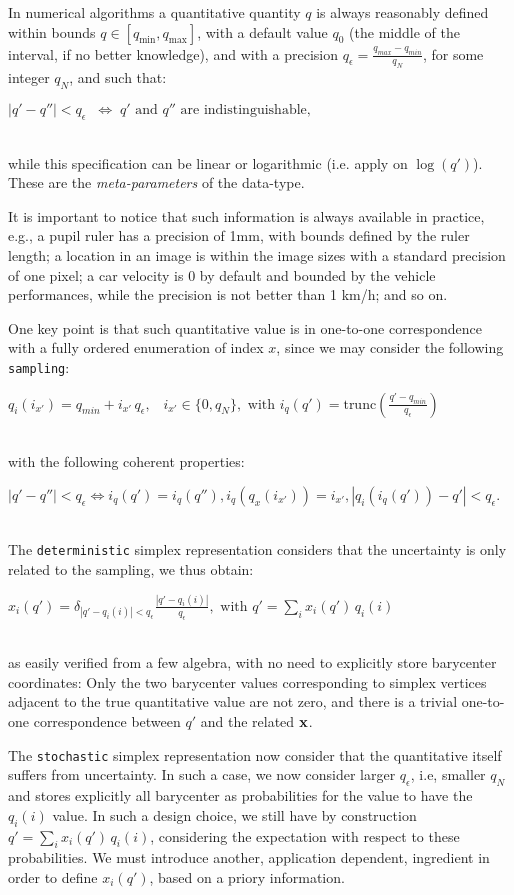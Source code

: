 \documentclass[a4,12pt]{article}
\newcommand{\eqline}[1]{\\\centerline{$#1$}\\}
\begin{document}
In numerical algorithms a quantitative quantity $q$ is always reasonably defined within bounds $q \in [q_{\min}, q_{\max}]$, with a default value $q_0$ (the middle of the interval, if no better knowledge), and with a precision $q_\epsilon = \frac{q_{max} - q_{min}}{q_N}$, for some integer $q_N$, and such that:
\eqline{|q' - q''| < q_\epsilon \;\;\Leftrightarrow\; \mbox{$q'$ and $q''$ are indistinguishable},}
while this specification can be linear or logarithmic (i.e. apply on $\log(q')$). These are the {\em meta-parameters} of the data-type.

It is important to notice that such information is always available in practice, e.g., a pupil ruler has a precision of 1mm, with bounds defined by the ruler length; a location in an image is within the image sizes with a standard precision of one pixel; a car velocity is 0 by default and bounded by the vehicle performances, while the precision is not better than 1 km/h; and so on.

One key point is that such quantitative value is in one-to-one correspondence with a fully ordered enumeration of index $x$, since we may consider the following {\tt sampling}:
\eqline{q_i(i_{x'}) = q_{min} + i_{x'} \, q_\epsilon, \;\;\; i_{x'} \in \{0, q_N\}, \mbox{ with } i_q(q') = \mbox{trunc}\left(\frac{q' - q_{min}}{q_\epsilon}\right)}
with the following coherent properties:
\eqline{|q' - q''| < q_\epsilon \Leftrightarrow i_q(q') = i_q(q''), i_q(q_x(i_{x'})) = i_{x'}, |q_i(i_q(q')) - q'| <  q_\epsilon.}

The {\tt deterministic} simplex representation considers that the uncertainty is only related to the sampling, we thus obtain:
\eqline{x_i(q') = \delta_{|q' - q_i(i)| < q_\epsilon} \frac{|q' - q_i(i)|}{q_\epsilon},  \mbox{ with } q' = \sum_i x_i(q') \, q_i(i)}
as easily verified from a few algebra, with no need to explicitly store barycenter coordinates: Only the two barycenter values corresponding to simplex vertices adjacent to the true quantitative value are not zero, and there is a trivial one-to-one correspondence between $q'$ and the related ${\bf x}$.

The {\tt stochastic} simplex representation now consider that the quantitative itself suffers from uncertainty. In such a case, we now consider larger $q_\epsilon$, i.e, smaller $q_N$ and stores explicitly all barycenter as probabilities for the value to have the $q_i(i)$ value. In such a design choice, we still have by construction $q' = \sum_i x_i(q') \, q_i(i)$, considering the expectation with respect to these probabilities. We must introduce another, application dependent, ingredient in order to define $x_i(q')$, based on a priory information.
\end{document}
